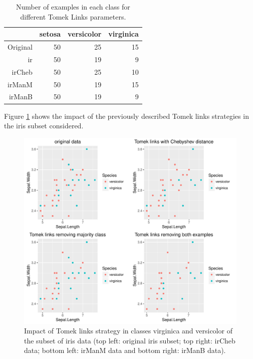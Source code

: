\documentclass[10pt,a4paper]{article}\usepackage[]{graphicx}\usepackage[]{color}
\makeatletter
\def\maxwidth{ %
  \ifdim\Gin@nat@width>\linewidth
    \linewidth
  \else
    \Gin@nat@width
  \fi
}
\newenvironment{knitrout}{}{} %
\makeatother
\begin{document}
\begin{table}[ht]
\centering
\begin{tabular}{rrrr}
  \hline
 & setosa & versicolor & virginica \\ 
  \hline
Original &  50 &  25 &  15 \\ 
  ir &  50 &  19 &   9 \\ 
  irCheb &  50 &  25 &  10 \\ 
  irManM &  50 &  19 &  15 \\ 
  irManB &  50 &  19 &   9 \\ 
   \hline
\end{tabular}
\caption{Number of examples in each class for different Tomek Links parameters.} 
\label{tab:irTL_table}
\end{table}



Figure \ref{fig:TL_difPar} shows the impact of the previously described Tomek links strategies in the iris subset considered.

\begin{knitrout}\footnotesize
{}\color{fgcolor}\begin{figure}

{\centering \includegraphics[width=\maxwidth]{figures/UBL-TL_difPar-1} 

}

\caption[Impact of Tomek links strategy in classes virginica and versicolor of the subset of iris data (top left]{Impact of Tomek links strategy in classes virginica and versicolor of the subset of iris data (top left: original iris subset; top right: irCheb data; bottom left: irManM data and bottom right: irManB data).}\label{fig:TL_difPar}
\end{figure}


\end{knitrout}
\end{document}
